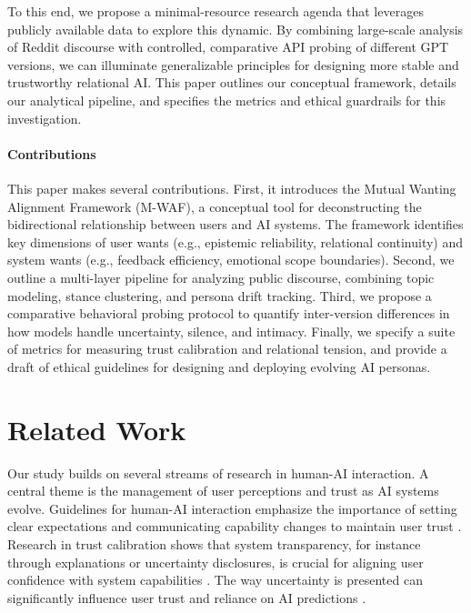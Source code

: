 \documentclass{article}
\begin{document}
To this end, we propose a minimal-resource research agenda that leverages publicly available data to explore this dynamic. By combining large-scale analysis of Reddit discourse with controlled, comparative API probing of different GPT versions, we can illuminate generalizable principles for designing more stable and trustworthy relational AI. This paper outlines our conceptual framework, details our analytical pipeline, and specifies the metrics and ethical guardrails for this investigation.

\paragraph{Contributions}
This paper makes several contributions. First, it introduces the Mutual Wanting Alignment Framework (M-WAF), a conceptual tool for deconstructing the bidirectional relationship between users and AI systems. The framework identifies key dimensions of user wants (e.g., epistemic reliability, relational continuity) and system wants (e.g., feedback efficiency, emotional scope boundaries). Second, we outline a multi-layer pipeline for analyzing public discourse, combining topic modeling, stance clustering, and persona drift tracking. Third, we propose a comparative behavioral probing protocol to quantify inter-version differences in how models handle uncertainty, silence, and intimacy. Finally, we specify a suite of metrics for measuring trust calibration and relational tension, and provide a draft of ethical guidelines for designing and deploying evolving AI personas.

\section{Related Work}
Our study builds on several streams of research in human-AI interaction. A central theme is the management of user perceptions and trust as AI systems evolve. Guidelines for human-AI interaction emphasize the importance of setting clear expectations and communicating capability changes to maintain user trust \citep{amershi2019guidelines}. Research in trust calibration shows that system transparency, for instance through explanations or uncertainty disclosures, is crucial for aligning user confidence with system capabilities \citep{yin2019understanding, lai2019human}. The way uncertainty is presented can significantly influence user trust and reliance on AI predictions \citep{kay2016uncertainty, reyes2025uncertainty}.
\end{document}
